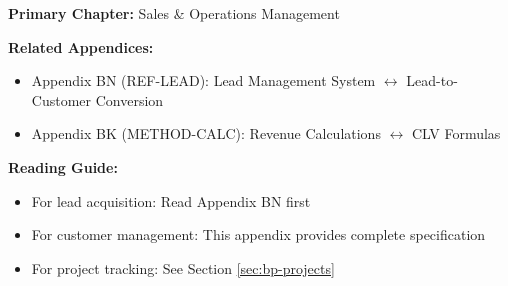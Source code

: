 %
%

%
%
%
%

\begin{tcolorbox}[colback=purple!5!white, colframe=purple!75!black,
    title=Chapter Linkage]

\textbf{Primary Chapter:} Sales \& Operations Management

\textbf{Related Appendices:}
\begin{itemize}[nosep]
\item Appendix BN (REF-LEAD): Lead Management System $\leftrightarrow$ Lead-to-Customer Conversion
\item Appendix BK (METHOD-CALC): Revenue Calculations $\leftrightarrow$ CLV Formulas
\end{itemize}

\textbf{Reading Guide:}
\begin{itemize}[nosep]
\item For lead acquisition: Read Appendix BN first
\item For customer management: This appendix provides complete specification
\item For project tracking: See Section \ref{sec:bp-projects}
\end{itemize}

\end{tcolorbox}

